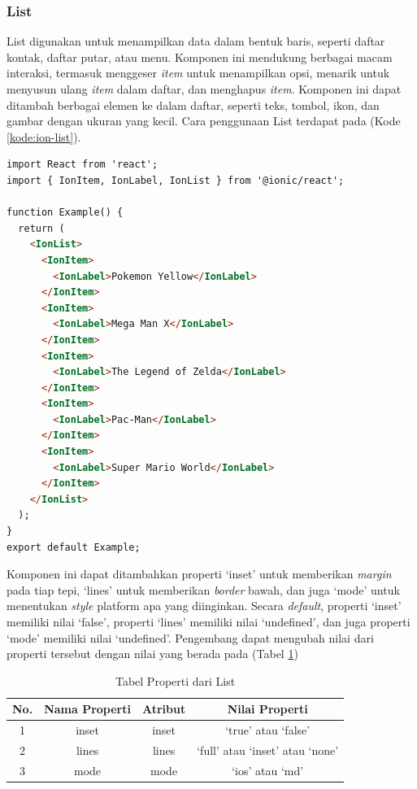 \subsubsection{List}
List digunakan untuk menampilkan data dalam bentuk baris, seperti daftar kontak, daftar putar, atau menu. Komponen ini mendukung berbagai macam interaksi, termasuk menggeser \textit{item} untuk menampilkan opsi, menarik untuk menyusun ulang \textit{item} dalam daftar, dan menghapus \textit{item}. Komponen ini dapat ditambah berbagai elemen ke dalam daftar, seperti teks, tombol, ikon, dan gambar dengan ukuran yang kecil. Cara penggunaan List terdapat pada (Kode \ref{kode:ion-list}).

\begin{lstlisting}[language=HTML, caption=Contoh Kode Penggunaan List, label=kode:ion-list]
import React from 'react';
import { IonItem, IonLabel, IonList } from '@ionic/react';

function Example() {
  return (
    <IonList>
      <IonItem>
        <IonLabel>Pokemon Yellow</IonLabel>
      </IonItem>
      <IonItem>
        <IonLabel>Mega Man X</IonLabel>
      </IonItem>
      <IonItem>
        <IonLabel>The Legend of Zelda</IonLabel>
      </IonItem>
      <IonItem>
        <IonLabel>Pac-Man</IonLabel>
      </IonItem>
      <IonItem>
        <IonLabel>Super Mario World</IonLabel>
      </IonItem>
    </IonList>
  );
}
export default Example;
\end{lstlisting}

Komponen ini dapat ditambahkan properti `inset' untuk memberikan \textit{margin} pada tiap tepi, `lines' untuk memberikan \textit{border} bawah, dan juga `mode' untuk menentukan \textit{style} platform apa yang diinginkan. Secara \textit{default}, properti `inset' memiliki nilai `false', properti `lines' memiliki nilai `undefined', dan juga properti `mode' memiliki nilai `undefined'. Pengembang dapat mengubah nilai dari properti tersebut dengan nilai yang berada pada (Tabel \ref{tab:list-property})

\begin{table} [H]
    \centering
    \caption{Tabel Properti dari List}
    \begin{tabular}{|c|c|c|c|}
    \hline
       No. & Nama Properti & Atribut & Nilai Properti \\ \hline
        1 & inset & inset & `true' atau `false'\\ \hline
        2 & lines & lines & `full' atau `inset' atau `none'\\ \hline
        3 & mode & mode & `ios' atau `md' \\ \hline
    \end{tabular}
    \label{tab:list-property}
\end{table}

